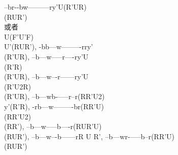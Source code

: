 \documentclass{article}
\begin{document}
{    {--br-}{-bw--}{--------r}{y'U(R'UR)\\(RUR')\\或者\\U(F'U'F)\\U'(RUR')}, %
    {-bb--}{--w--}{-------rr}{y'\\(R'UR)}, %
    {--b--}{--w--}{---r----r}{y'U\\(R'R)\\(R'UR)}, %
    {--b--}{--w--}{-r------r}{y'U\\(R'U2R)\\(R'UR)}, %
    {--b--}{--wb-}{-----r--r}{(RR'U2)\\y'(R'R)}, %
    {-rb--}{--w--}{-------br}{(RR'U)\\(RR'U2)\\(RR')}, %
    {--b--}{--w--}{---b----r}{(RUR'U)\\(RUR')}, %
    {--b--}{--w--}{-b------r}{R U R'}, %
    {--b--}{--wr-}{-----b--r}{(RR'U)\\(RUR')} %
}
\end{document}
